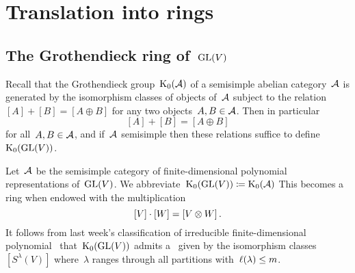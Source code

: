 \documentclass[a4paper,10pt]{scrartcl}
\begin{document}





\section{Translation into rings}



\subsection{The Grothendieck ring of~$\operatorname{GL}(V)$}

Recall that the Grothendieck group~$\operatorname{K}_0(\mathcal{A})$ of a semisimple abelian category~$\mathcal{A}$ is generated by the isomorphism classes of objects of~$\mathcal{A}$ subject to the relation~$[A] + [B] = [A \oplus B]$ for any two objects~$A, B \in \mathcal{A}$.
Then in particular
\begin{equation}
  \label{additivity in grothendieck group}
  [A] + [B] = [A \oplus B]
\end{equation}
for all~$A, B \in \mathcal{A}$, and if~$\mathcal{A}$ semisimple then these relations suffice to define~$\operatorname{K}_0(\operatorname{GL}(V))$.

Let~$\mathcal{A}$ be the semisimple category of finite-dimensional polynomial representations of~$\operatorname{GL}(V)$.
We abbreviate~$\operatorname{K}_0(\operatorname{GL}(V)) \coloneqq \operatorname{K}_0(\mathcal{A})$
This becomes a ring when endowed with the multiplication
\[
  [V] \cdot [W]
  =
  [V \otimes W] \,.
\]
It follows from last week’s classification of irreducible finite-dimensional polynomial~{} that~$\operatorname{K}_0(\operatorname{GL}(V))$ admits a~{\basis{$\Integer$}} given by the isomorphism classes~$[S^\lambda(V)]$ where~$\lambda$ ranges through all partitions with~$\operatorname{\ell}(\lambda) \leq m$.
\end{document}
